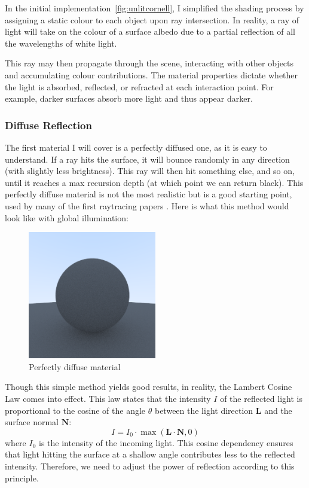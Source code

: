 \documentclass[12pt]{article}
\begin{document}
In the initial implementation~\ref{fig:unlitcornell}, I simplified the shading process by assigning a static colour to each object upon ray intersection. In reality, a ray of light will take on the colour of a surface albedo due to a partial reflection of all the wavelengths of white light.

This ray may then propagate through the scene, interacting with other objects and accumulating colour contributions. The material properties dictate whether the light is absorbed, reflected, or refracted at each interaction point. For example, darker surfaces absorb more light and thus appear darker.

\subsubsection{Diffuse Reflection}
The first material I will cover is a perfectly diffused one, as it is easy to understand. If a ray hits the surface, it will bounce randomly in any direction (with slightly less brightness). This ray will then hit something else, and so on, until it reaches a max recursion depth (at which point we can return black). This perfectly diffuse material is not the most realistic but is a good starting point, used by many of the first raytracing papers \cite{Whitted1980}. Here is what this method would look like with global illumination:

\begin{figure}[H]
    \centering
    \includegraphics[width=0.5\textwidth]{images/lambertian/uniform_diffuse.png}
    \caption{Perfectly diffuse material}
    \label{fig:perfdiffmat}
\end{figure}

Though this simple method yields good results, in reality, the Lambert Cosine Law comes into effect. This law states that the intensity \(I\) of the reflected light is proportional to the cosine of the angle \(\theta\) between the light direction \(\mathbf{L}\) and the surface normal \(\mathbf{N}\):
\[
    I = I_0 \cdot \max(\mathbf{L} \cdot \mathbf{N}, 0)
\]
where \(I_0\) is the intensity of the incoming light. This cosine dependency ensures that light hitting the surface at a shallow angle contributes less to the reflected intensity. Therefore, we need to adjust the power of reflection according to this principle.
\end{document}
